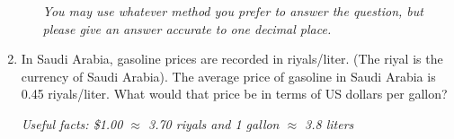 \documentclass[12pt]{article}
\begin{document}
\begin{enumerate}
\begin{enumerate}
\emph{You may use whatever method you prefer to answer the question, but please give an answer accurate to one decimal place.}
\vfill
\end{enumerate}

\noindent \hrulefill
\item In Saudi Arabia, gasoline prices are recorded in riyals/liter.  (The riyal is the currency of Saudi Arabia).  The average price of gasoline in Saudi Arabia is 0.45 riyals/liter.  What would that price be in terms of US dollars per gallon?

\emph{Useful facts:  \$1.00 $\approx$ 3.70 riyals and 1 gallon $\approx$ 3.8 liters }
\vfill


\end{enumerate}



\end{document}
